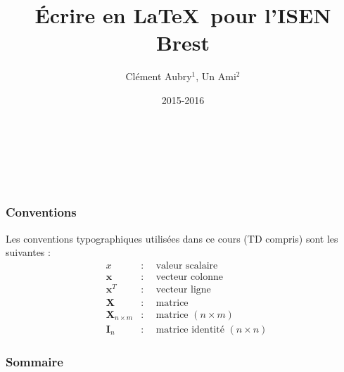 \documentclass[french,svgnames,10pt]{beamer}
\title{Écrire en \LaTeX\ pour l'ISEN Brest}
\author[C.Aubry, Un.Ami]{Cl\'{e}ment Aubry$^{\text{1}}$, Un Ami$^{\text{2}}$}%
\institute[]{ISEN Brest$^{\text{1}}$, Autre École$^{\text{2}}$}
\date{2015-2016}
\begin{document}
{
\begin{frame}[plain]
  \vspace*{1cm}
  \begin{center}
    \textcolor{grayisen!30!white}{%
    {\huge{\inserttitle}}\\
    \insertauthor\\
    \insertinstitute\\
    \insertdate}
  \end{center}
\end{frame}}

\begin{frame}
\frametitle{Conventions}
Les conventions typographiques utilisées dans ce cours (TD compris) sont les suivantes : 
\begin{align*}
&x &:&~~\text{valeur scalaire}\\
&\mathbf{x} &:&~~\text{vecteur colonne}\\
&\mathbf{x}^T  &:&~~\text{vecteur ligne}\\
&\mathbf{X} &:&~~\text{matrice}\\
&\mathbf{X}_{n\times m} &:&~~\text{matrice $(n\times m)$}\\
&\mathbf{I}_{n} &:&~~\text{matrice identité $(n\times n)$}
\end{align*}
\end{frame}

\begin{frame}
  \frametitle{Sommaire} 
  \null
  \vspace{-1.8cm}
  \tableofcontents[hideallsubsections]
\end{frame}




\end{document}
